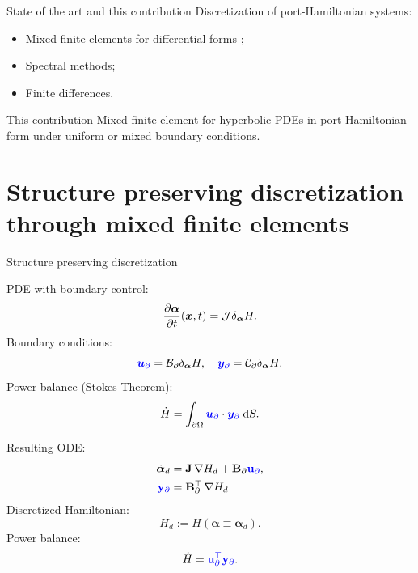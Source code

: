 \documentclass[aspectratio=169]{ISAE-Beamer}
\begin{document}
\begin{frame}{State of the art and this contribution}
Discretization of port-Hamiltonian systems:
\begin{itemize}
\item Mixed finite elements for differential forms ;
\item Spectral methods;
\item Finite differences.
\end{itemize}

\begin{exampleblock}{This contribution}
	Mixed finite element for hyperbolic PDEs in port-Hamiltonian form under uniform or mixed boundary conditions. 
\end{exampleblock}

\end{frame}


\section{Structure preserving discretization through mixed finite elements}


\begin{frame}{Structure preserving discretization}
	\begin{tcbraster}[raster columns=2, raster equal height]
		\begin{tcolorbox}[width=0.4\textwidth, nobeforeafter, colframe=theme,title=Infinite-dimensional pH system]%
			PDE with boundary control:
			\begin{equation*}
				\diffp{\bm{\alpha}}{t}(\bm{x}, t) = \mathcal{J} \delta_{\bm{\alpha}} H.
			\end{equation*}
			Boundary conditions: 
			\[\textcolor{blue}{\bm{u}_\partial} = \mathcal{B}_\partial \delta_{\bm{\alpha}} H, \quad \textcolor{blue}{\bm{y}_\partial} = \mathcal{C}_\partial \delta_{\bm{\alpha}} H. \]
			Power balance (Stokes Theorem): 
			\[ \dot{H} = \displaystyle \int_{\partial \Omega} \textcolor{blue}{\bm{u}_\partial} \cdot \textcolor{blue}{\bm{y}_\partial} \d{S}.
			\]
		\end{tcolorbox} 
		\begin{tcolorbox}[width=0.4\textwidth, nobeforeafter,  colframe=theme,title=Structure-preserving discretization]%
			Resulting ODE:
			\begin{align*}
				\dot{\bm{\alpha}}_d &= \mathbf{J} \, {\nabla {H}_d} + \mathbf{B}_\partial \textcolor{blue}{\mathbf{u}_\partial}, \\
				\textcolor{blue}{\mathbf{y}_\partial} &= \mathbf{B}_\partial^\top \,{\nabla {H}_d}.
			\end{align*}
			Discretized Hamiltonian:
			\[
			H_d := H(\bm{\alpha} \equiv \bm{\alpha}_d).
			\]
			Power balance: 
			\[ \dot{H} = \textcolor{blue}{\mathbf{u}_\partial^\top \mathbf{y}_\partial}.
			\]
		\end{tcolorbox}
	\end{tcbraster}
\end{frame}
\end{document}
